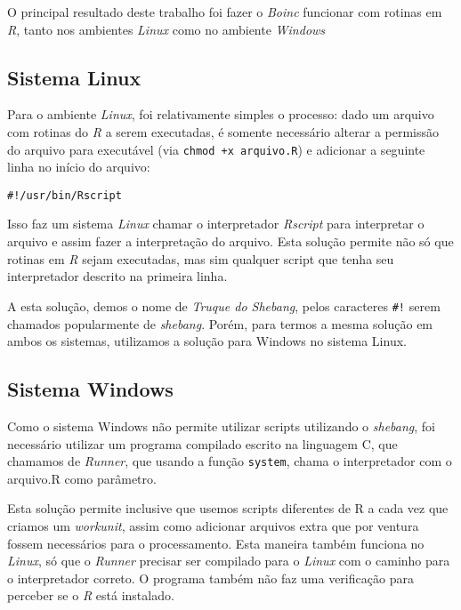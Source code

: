 O principal resultado deste trabalho foi fazer o \emph{Boinc} funcionar com rotinas em \emph{R}, tanto
nos ambientes \emph{Linux} como no ambiente \emph{Windows} %

\subsection{Sistema Linux}

Para o ambiente \emph{Linux}, foi relativamente simples o processo: dado um arquivo com rotinas
do \emph{R} a serem executadas, é somente necessário alterar a permissão do arquivo para executável 
(via \verb#chmod +x arquivo.R#) e adicionar a seguinte linha no início do arquivo:

\begin{verbatim}
#!/usr/bin/Rscript
\end{verbatim}

Isso faz um sistema \emph{Linux} chamar o interpretador \emph{Rscript} para interpretar o arquivo  
e assim fazer a interpretação do arquivo. Esta solução permite não só que rotinas em \emph{R} sejam
executadas, mas sim qualquer script que tenha seu interpretador descrito na primeira linha.

A esta solução, demos o nome de \emph{Truque do Shebang}, pelos caracteres \verb'#!' serem chamados
popularmente de \emph{shebang}. Porém, para termos a mesma solução em ambos os sistemas, utilizamos a solução para
Windows no sistema Linux.

\subsection{Sistema Windows} %

Como o sistema Windows não permite utilizar scripts utilizando o \emph{shebang}, foi necessário 
utilizar um programa compilado escrito na linguagem C, que chamamos de \emph{Runner}, 
que usando a função \verb#system#, chama o interpretador com o arquivo.R como parâmetro. 

Esta solução permite inclusive que usemos scripts diferentes de R a cada vez que criamos um 
\emph{workunit}, assim como adicionar arquivos extra que por ventura fossem necessários para
o processamento. Esta maneira também funciona no \emph{Linux}, só que o \emph{Runner} precisar
ser compilado para o \emph{Linux} com o caminho para o interpretador correto. O programa também não faz
uma verificação para perceber se o \emph{R} está instalado. 

